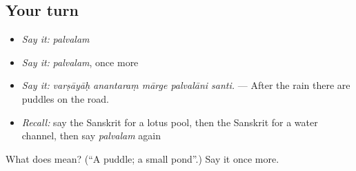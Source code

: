 \subsection*{Your turn}
\begin{itemize}
\raggedright
  \item \emph{Say it:} \emph{palvalam}
  \item \emph{Say it:} \emph{palvalam}, once more
  \item \emph{Say it:} \emph{varṣāyāḥ anantaraṃ mārge palvalāni santi.} — After the rain there are puddles on the road.
  \item \emph{Recall:} say the Sanskrit for a lotus pool, then the Sanskrit for a water channel, then say \emph{palvalam} again
\end{itemize}

\begin{tcolorbox}[breakable,colback=teal!4,colframe=teal!35!black,title={Before you move on}]
What does  mean? (\textquotedblleft{}A puddle; a small pond\textquotedblright{}.) Say it once more.
\end{tcolorbox}
